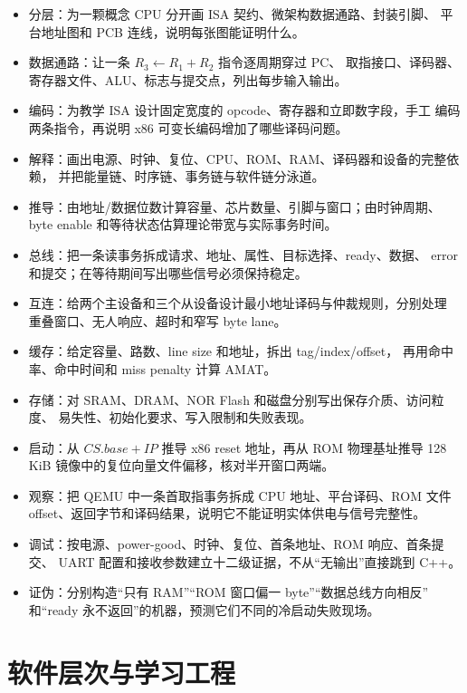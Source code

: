 \begin{itemize}
  \item 分层：为一颗概念 CPU 分开画 ISA 契约、微架构数据通路、封装引脚、
        平台地址图和 PCB 连线，说明每张图能证明什么。
  \item 数据通路：让一条 \(R_3\leftarrow R_1+R_2\) 指令逐周期穿过 PC、
        取指接口、译码器、寄存器文件、ALU、标志与提交点，列出每步输入输出。
  \item 编码：为教学 ISA 设计固定宽度的 opcode、寄存器和立即数字段，手工
        编码两条指令，再说明 x86 可变长编码增加了哪些译码问题。
  \item 解释：画出电源、时钟、复位、CPU、ROM、RAM、译码器和设备的完整依赖，
        并把能量链、时序链、事务链与软件链分泳道。
  \item 推导：由地址/数据位数计算容量、芯片数量、引脚与窗口；由时钟周期、
        byte enable 和等待状态估算理论带宽与实际事务时间。
  \item 总线：把一条读事务拆成请求、地址、属性、目标选择、ready、数据、
        error 和提交；在等待期间写出哪些信号必须保持稳定。
  \item 互连：给两个主设备和三个从设备设计最小地址译码与仲裁规则，分别处理
        重叠窗口、无人响应、超时和窄写 byte lane。
  \item 缓存：给定容量、路数、line size 和地址，拆出 tag/index/offset，
        再用命中率、命中时间和 miss penalty 计算 AMAT。
  \item 存储：对 SRAM、DRAM、NOR Flash 和磁盘分别写出保存介质、访问粒度、
        易失性、初始化要求、写入限制和失败表现。
  \item 启动：从 \(CS.base+IP\) 推导 x86 reset 地址，再从 ROM 物理基址推导
        128 KiB 镜像中的复位向量文件偏移，核对半开窗口两端。
  \item 观察：把 QEMU 中一条首取指事务拆成 CPU 地址、平台译码、ROM 文件
        offset、返回字节和译码结果，说明它不能证明实体供电与信号完整性。
  \item 调试：按电源、power-good、时钟、复位、首条地址、ROM 响应、首条提交、
        UART 配置和接收参数建立十二级证据，不从“无输出”直接跳到 C++。
  \item 证伪：分别构造“只有 RAM”“ROM 窗口偏一 byte”“数据总线方向相反”
        和“ready 永不返回”的机器，预测它们不同的冷启动失败现场。
\end{itemize}

\section*{软件层次与学习工程}

